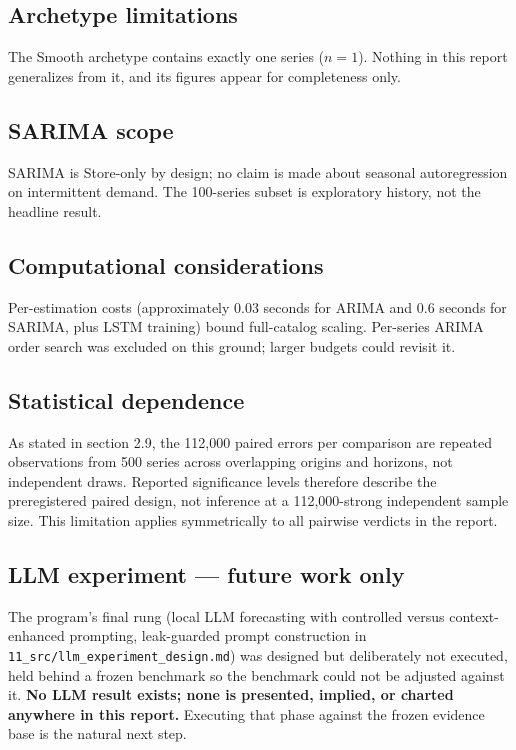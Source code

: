 \subsection{Archetype limitations}
\label{sec:smooth-cap}
The Smooth archetype contains exactly one series ($n=1$). Nothing in this
report generalizes from it, and its figures appear for completeness only.

\subsection{SARIMA scope}
\label{sec:l-sarima}
SARIMA is Store-only by design; no claim is made about seasonal
autoregression on intermittent demand. The 100-series subset is exploratory
history, not the headline result.

\subsection{Computational considerations}
\label{sec:l-compute}
Per-estimation costs (approximately 0.03 seconds for ARIMA and 0.6 seconds
for SARIMA, plus LSTM training) bound full-catalog scaling. Per-series ARIMA
order search was excluded on this ground; larger budgets could revisit it.

\subsection{Statistical dependence}
\label{sec:l-dependence}
As stated in section 2.9, the 112,000 paired errors per
comparison are repeated observations from 500 series across overlapping
origins and horizons, not independent draws. Reported significance levels
therefore describe the preregistered paired design, not inference at a
112,000-strong independent sample size. This limitation applies symmetrically
to all pairwise verdicts in the report.

\subsection{LLM experiment --- future work only}
\label{sec:llm-future}
The program's final rung (local LLM forecasting with controlled versus
context-enhanced prompting, leak-guarded prompt construction in
\texttt{11\_src/llm\_experiment\_design.md}) was designed but deliberately
not executed, held behind a frozen benchmark so the benchmark could not be
adjusted against it. \textbf{No LLM result exists; none is presented,
implied, or charted anywhere in this report.} Executing that phase against
the frozen evidence base is the natural next step.


